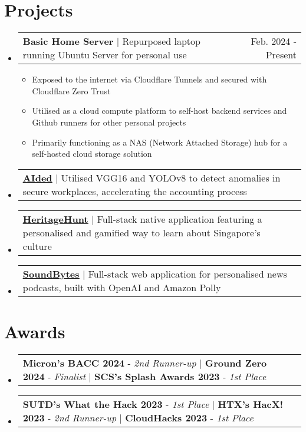 \documentclass[letterpaper,11pt]{article}
\makeatletter
\newcommand{\resumeItem}[1]{
  \item\small{
    {#1 \vspace{-2pt}}
  }
}
\newcommand{\resumeProjectHeading}[2]{
    \item
    \begin{tabular*}{0.97\textwidth}{l@{\extracolsep{\fill}}r}
      \small#1 & #2 \\
    \end{tabular*}\vspace{-7pt}
}
\newcommand{\resumeSubHeadingListStart}{\begin{itemize}[leftmargin=0.15in, label={}]}
\newcommand{\resumeSubHeadingListEnd}{\end{itemize}}
\newcommand{\resumeItemListStart}{\begin{itemize}}
\newcommand{\resumeItemListEnd}{\end{itemize}\vspace{-5pt}}
\makeatother
\begin{document}
\section{Projects}
  \resumeSubHeadingListStart
    \resumeProjectHeading
      {\textbf{Basic Home Server}  $|$ Repurposed laptop running Ubuntu Server for personal use}{Feb. 2024 - Present}
      \resumeItemListStart
        \resumeItem{Exposed to the internet via Cloudflare Tunnels and secured with Cloudflare Zero Trust}
        \resumeItem{Utilised as a cloud compute platform to self-host backend services and Github runners for other personal projects}
        \resumeItem{Primarily functioning as a NAS (Network Attached Storage) hub for a self-hosted cloud storage solution}
      \resumeItemListEnd
    \resumeProjectHeading
      {\textbf{\href{https://github.com/duckyfuz/accountingReID-hacX2023}{\underline{AIded}}} $|$ Utilised VGG16 and YOLOv8 to detect anomalies in secure workplaces, accelerating the accounting process}{}
    \resumeProjectHeading
      {\textbf{\href{https://github.com/duckyfuz/heritageHunt-SplashAwards2023}{\underline{HeritageHunt}}} $|$ Full-stack native application featuring a personalised and gamified way to learn about Singapore’s culture}{}
    \resumeProjectHeading
      {\textbf{\href{https://github.com/duckyfuz/soundBytes-cloudHacks2023}{\underline{SoundBytes}}} $|$ Full-stack web application for personalised news podcasts, built with OpenAI and Amazon Polly}{}
  \resumeSubHeadingListEnd

\section{Awards}
  \resumeSubHeadingListStart
    \resumeProjectHeading
    {\textbf{Micron's BACC 2024} - \emph{2nd Runner-up} $|$ \textbf{Ground Zero 2024} - \emph{Finalist} $|$ \textbf{SCS's Splash Awards 2023} - \emph{1st Place}}{}
    \resumeProjectHeading
        {\textbf{SUTD's What the Hack 2023} - \emph{1st Place} $|$ \textbf{HTX's HacX! 2023} - \emph{2nd Runner-up} $|$ \textbf{CloudHacks 2023} - \emph{1st Place}}{}
  \resumeSubHeadingListEnd
\end{document}
